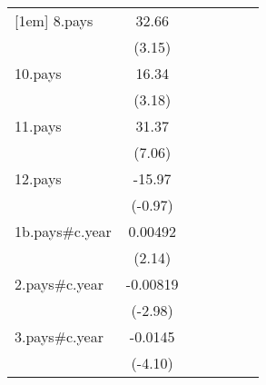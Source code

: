 {\begin{tabular}{l*{6}{c}}
[1em]
8.pays              &       32.66\sym{**} &                     &                     &                     &                     &                     \\
                    &      (3.15)         &                     &                     &                     &                     &                     \\
[1em]
10.pays             &       16.34\sym{**} &                     &                     &                     &                     &                     \\
                    &      (3.18)         &                     &                     &                     &                     &                     \\
[1em]
11.pays             &       31.37\sym{***}&                     &                     &                     &                     &                     \\
                    &      (7.06)         &                     &                     &                     &                     &                     \\
[1em]
12.pays             &      -15.97         &                     &                     &                     &                     &                     \\
                    &     (-0.97)         &                     &                     &                     &                     &                     \\
[1em]
1b.pays#c.year      &     0.00492\sym{*}  &                     &                     &                     &                     &                     \\
                    &      (2.14)         &                     &                     &                     &                     &                     \\
[1em]
2.pays#c.year       &    -0.00819\sym{**} &                     &                     &                     &                     &                     \\
                    &     (-2.98)         &                     &                     &                     &                     &                     \\
[1em]
3.pays#c.year       &     -0.0145\sym{***}&                     &                     &                     &                     &                     \\
                    &     (-4.10)         &                     &                     &                     &                     &                     \\

\end{tabular}}
